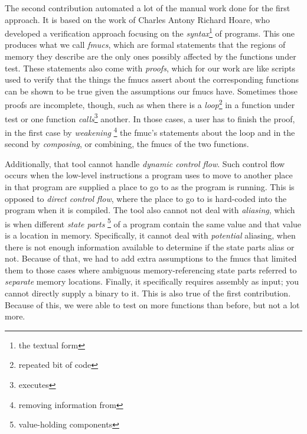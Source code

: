 {  The second contribution automated a lot of the manual work done for the first approach.
  It is based on the work of Charles Antony Richard Hoare, who developed a verification approach focusing on the \emph{syntax}\footnote{the textual form} of programs.
  This one produces what we call \emph{\acp{fmuc}}, which are formal statements that the regions of memory they describe are the only ones possibly affected by the functions under test.
  These statements also come with \emph{proofs}, which for our work are like scripts used to verify that the things the \acp{fmuc} assert about the corresponding functions can be shown to be true given the assumptions our \acp{fmuc} have.
  Sometimes those proofs are incomplete, though, such as when there is a \emph{loop}\footnote{repeated bit of code} in a function under test or one function \emph{calls}\footnote{executes} another.
  In those cases, a user has to finish the proof, in the first case by \emph{weakening}%
  \footnote{removing information from}
  the \ac{fmuc}'s statements about the loop and in the second by \emph{composing}, or combining, the \acp{fmuc} of the two functions.

  Additionally, that tool cannot handle \emph{dynamic control flow}.
  Such control flow occurs when the low-level instructions a program uses to move to another place in that program are supplied a place to go to as the program is running.
  This is opposed to \emph{direct control flow}, where the place to go to is hard-coded into the program when it is compiled.
  The tool also cannot not deal with \emph{aliasing}, which is when different \emph{state parts}%
  \footnote{value-holding components}
  of a program contain the same value and that value is a location in memory.
  Specifically, it cannot deal with \emph{potential} aliasing, when there is not enough information available to determine if the state parts alias or not.
  Because of that, we had to add extra assumptions to the \acp{fmuc} that limited them to those cases where ambiguous memory-referencing state parts referred to \emph{separate} memory locations.
  Finally, it specifically requires assembly as input; you cannot directly supply a binary to it.
  This is also true of the first contribution.
  Because of this, we were able to test on more functions than before, but not a lot more.

}
